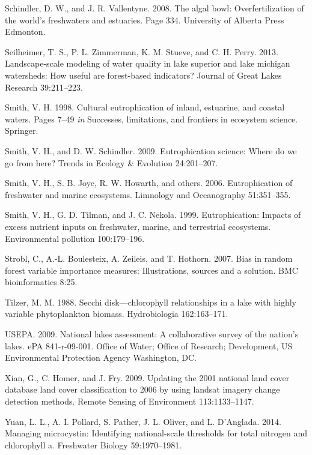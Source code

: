 \documentclass[12pt,]{article}
\begin{document}
Schindler, D. W., and J. R. Vallentyne. 2008. The algal bowl:
Overfertilization of the world's freshwaters and estuaries. Page 334.
University of Alberta Press Edmonton.

Seilheimer, T. S., P. L. Zimmerman, K. M. Stueve, and C. H. Perry. 2013.
Landscape-scale modeling of water quality in lake superior and lake
michigan watersheds: How useful are forest-based indicators? Journal of
Great Lakes Research 39:211--223.

Smith, V. H. 1998. Cultural eutrophication of inland, estuarine, and
coastal waters. Pages 7--49 \emph{in} Successes, limitations, and
frontiers in ecosystem science. Springer.

Smith, V. H., and D. W. Schindler. 2009. Eutrophication science: Where
do we go from here? Trends in Ecology \& Evolution 24:201--207.

Smith, V. H., S. B. Joye, R. W. Howarth, and others. 2006.
Eutrophication of freshwater and marine ecosystems. Limnology and
Oceanography 51:351--355.

Smith, V. H., G. D. Tilman, and J. C. Nekola. 1999. Eutrophication:
Impacts of excess nutrient inputs on freshwater, marine, and terrestrial
ecosystems. Environmental pollution 100:179--196.

Strobl, C., A.-L. Boulesteix, A. Zeileis, and T. Hothorn. 2007. Bias in
random forest variable importance measures: Illustrations, sources and a
solution. BMC bioinformatics 8:25.

Tilzer, M. M. 1988. Secchi disk---chlorophyll relationships in a lake
with highly variable phytoplankton biomass. Hydrobiologia 162:163--171.

USEPA. 2009. National lakes assessment: A collaborative survey of the
nation's lakes. ePA 841-r-09-001. Office of Water; Office of Research;
Development, US Environmental Protection Agency Washington, DC.

Xian, G., C. Homer, and J. Fry. 2009. Updating the 2001 national land
cover database land cover classification to 2006 by using landsat
imagery change detection methods. Remote Sensing of Environment
113:1133--1147.

Yuan, L. L., A. I. Pollard, S. Pather, J. L. Oliver, and L. D'Anglada.
2014. Managing microcystin: Identifying national-scale thresholds for
total nitrogen and chlorophyll a. Freshwater Biology 59:1970--1981.
\end{document}
